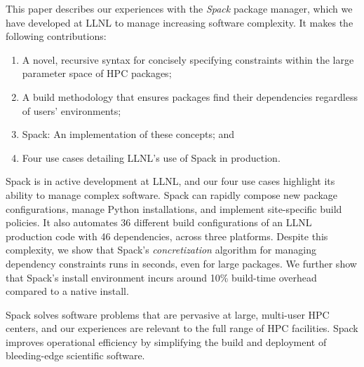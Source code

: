 This paper describes our experiences with the {\it Spack} package manager,
which we have developed at LLNL to manage increasing software complexity.
It makes the following contributions:
\begin{enumerate}
\item A novel, recursive syntax for concisely specifying constraints within
      the large parameter space of HPC packages;
\item A build methodology that ensures packages find their dependencies
      regardless of users' environments;
\item Spack: An implementation of these concepts; and
\item Four use cases detailing LLNL's use of Spack in production.
\end{enumerate}
\noindent
Spack is in active development at LLNL, and our four use cases
highlight its ability to manage complex software.
%
Spack can rapidly compose new package configurations,
manage Python installations, and implement site-specific build policies. 
%
It also automates 36 different build configurations of an
LLNL production code with 46 dependencies, across three platforms.  Despite
this complexity, we show that Spack's {\it concretization} algorithm
for managing
dependency constraints runs in seconds, even for large packages.
We further show that Spack's install environment incurs around
10\% build-time overhead compared to a native install.

Spack solves software problems that are pervasive at large,
multi-user HPC centers, and our experiences are relevant to the 
full range of HPC facilities.  Spack improves
operational efficiency by simplifying the build and deployment of
bleeding-edge scientific software.  





